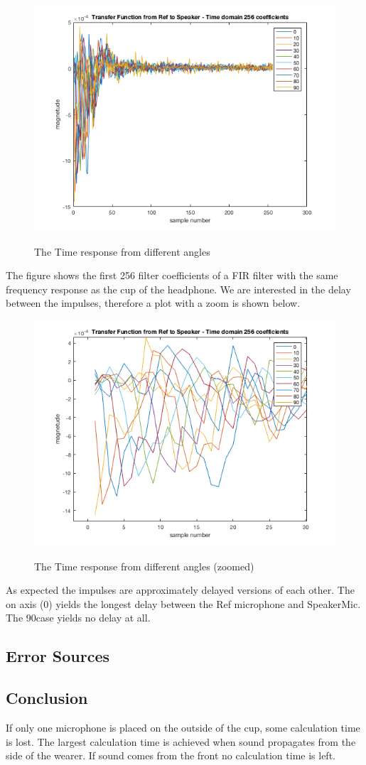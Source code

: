\begin{figure}[H]
	\includegraphics[width=\textwidth]{../Journal/Experiments/AngleOfIncidence/impulseRef2Speaker.png}
	\label{Fig:AngOfIncTime}
	\caption{The Time response from different angles}
\end{figure}
The figure shows the first 256 filter coefficients of a FIR filter with the same frequency response as the cup of the headphone. We are interested in the delay between the impulses, therefore a plot with a zoom is shown below.
\begin{figure}[H]
	\includegraphics[width=\textwidth]{../Journal/Experiments/AngleOfIncidence/impulsezoomRef2Speaker.png}
	\label{Fig:AngOfIncTimezoom}
	\caption{The Time response from different angles (zoomed)}
\end{figure} 
As expected the impulses are approximately delayed versions of each other. The on axis (0\textdegree) yields the longest delay between the Ref microphone and SpeakerMic. The 90\textdegree case yields no delay at all. 

\subsection{Error Sources}

\subsection{Conclusion}
If only one microphone is placed on the outside of the cup, some calculation time is lost. The largest calculation time is achieved when sound propagates from the side of the wearer. If sound comes from the front no calculation time is left. 